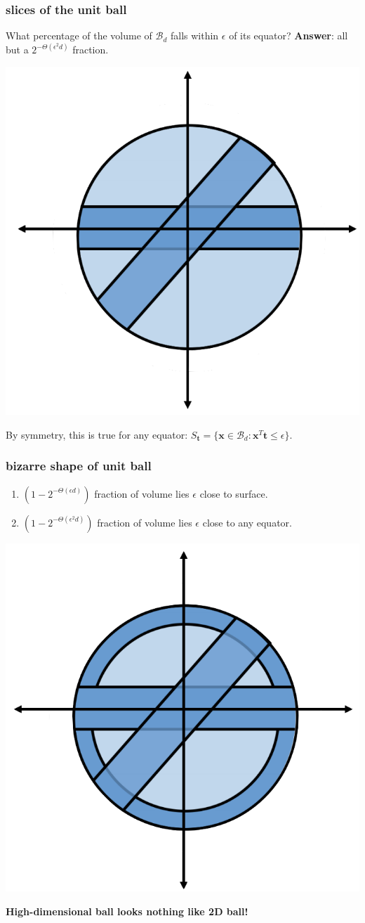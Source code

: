 \documentclass[compress]{beamer}
\newcommand{\bv}[1]{\mathbf{#1}}
\begin{document}
\begin{frame}[t]
	\frametitle{slices of the unit ball}
	\alert{What percentage of the volume of $\mathcal{B}_d$ falls within $\epsilon$ of its equator?} \textbf{Answer}: all but a $2^{-\Theta(\epsilon^2 d)}$ fraction.
	\vspace{-.5em}
	\begin{center}
		\includegraphics[width=.5\textwidth]{2equators.png}
		
		\vspace{-.5em}
		By symmetry, this is true for any equator: $S_{\bv{t}} = \{\bv{x}\in \mathcal{B}_d: \bv{x}^T\bv{t}\leq \epsilon\}$.
	\end{center}
\end{frame}

\begin{frame}[t]
	\frametitle{bizarre shape of unit ball}
	\begin{enumerate}
		\item $(1 -2^{-\Theta(\epsilon d)})$ fraction of volume lies $\epsilon$ close to surface. 
		\item $(1 -  2^{-\Theta(\epsilon^2 d)})$ fraction of volume lies $\epsilon$ close to any equator. 
	\end{enumerate}

	\begin{center}
	\includegraphics[width=.5\textwidth]{equators_surface.png}
	
	\textbf{\alert{High-dimensional ball looks nothing like 2D ball!}}
	\end{center}
\end{frame}
\end{document}
